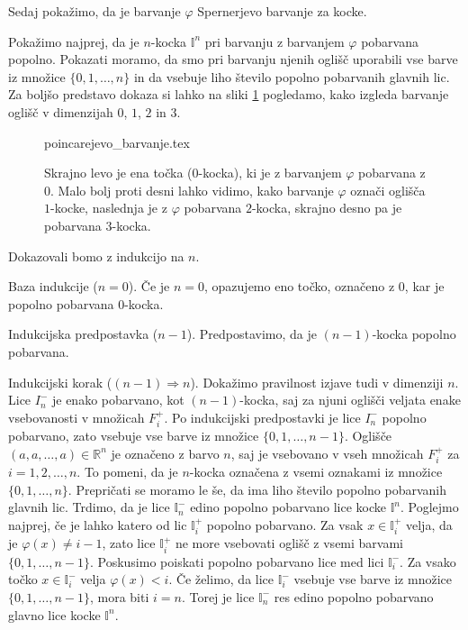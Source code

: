 \documentclass[mat1]{fmfdelo}
\newcommand{\R}{\mathbb R}
\newcommand{\I}{\mathbb I}
\newcommand{\0}{\underline{0}}
\begin{document}
Sedaj pokažimo, da je barvanje $\varphi$ Spernerjevo barvanje za kocke.
\begin{dokaz}
Pokažimo najprej, da je $n$-kocka $\I^n$ pri barvanju z barvanjem $\varphi$ pobarvana popolno. Pokazati moramo, da smo pri barvanju njenih oglišč uporabili vse barve iz množice $\{ 0, 1, \dots, n \}$ in da vsebuje liho število popolno pobarvanih glavnih lic. Za boljšo predstavo dokaza si lahko na sliki \ref{fig:PMcolor} pogledamo, kako izgleda barvanje oglišč v dimenzijah $0$, $1$, $2$ in $3$.
\begin{figure}[h!]
	\centering
	{poincarejevo_barvanje.tex}
	\caption{Skrajno levo je ena točka ($0$-kocka), ki je z barvanjem $\varphi$ pobarvana z $0$. Malo bolj proti desni lahko vidimo, kako barvanje $\varphi$ označi oglišča $1$-kocke, naslednja je z $\varphi$ pobarvana $2$-kocka, skrajno desno pa je pobarvana $3$-kocka.}\label{fig:PMcolor}
\end{figure}
Dokazovali bomo z indukcijo na $n$.

Baza indukcije ($n = 0$).
Če je $n=0$, opazujemo eno točko, označeno z $0$, kar je popolno pobarvana $0$-kocka.

Indukcijska predpostavka ($n - 1$).
Predpostavimo, da je $(n - 1)$-kocka popolno pobarvana.

Indukcijski korak ($(n - 1) \Longrightarrow n$).
Dokažimo pravilnost izjave tudi v dimenziji $n$. Lice $I_n^-$ je enako pobarvano, kot $(n-1)$-kocka, saj za njuni oglišči veljata enake vsebovanosti v množicah $F_i^+$. Po indukcijski predpostavki je lice $I_n^-$ popolno pobarvano, zato vsebuje vse barve iz množice $\{ 0, 1, \dots, n-1\}$. Oglišče $(a, a, \dots, a) \in \R^n$ je označeno z barvo $n$, saj je vsebovano v vseh množicah $F_i^+$ za $i = 1, 2, \dots, n$. To pomeni, da je $n$-kocka označena z vsemi oznakami iz množice $\{ 0, 1, \dots, n \}$. Prepričati se moramo le še, da ima liho število popolno pobarvanih glavnih lic. 
Trdimo, da je lice $\I_n^-$ edino popolno pobarvano lice kocke $\I^n$. Poglejmo najprej, če je lahko katero od lic $\I_i^+$ popolno pobarvano. Za vsak $x \in \I_i^+$ velja, da je $\varphi (x) \neq i-1$, zato lice $\I_i^+$ ne more vsebovati oglišč z vsemi barvami $\{ 0, 1, \dots, n - 1 \}$. Poskusimo poiskati popolno pobarvano lice med lici $\I_i^-$. Za vsako točko $x \in \I_i^-$ velja $\varphi (x) < i$. Če želimo, da lice $\I_i^-$ vsebuje vse barve iz množice $\{ 0, 1, \dots, n - 1 \}$, mora biti $i = n$. Torej je lice $\I_n^-$ res edino popolno pobarvano glavno lice kocke $\I^n$.


\end{dokaz}
\end{document}
